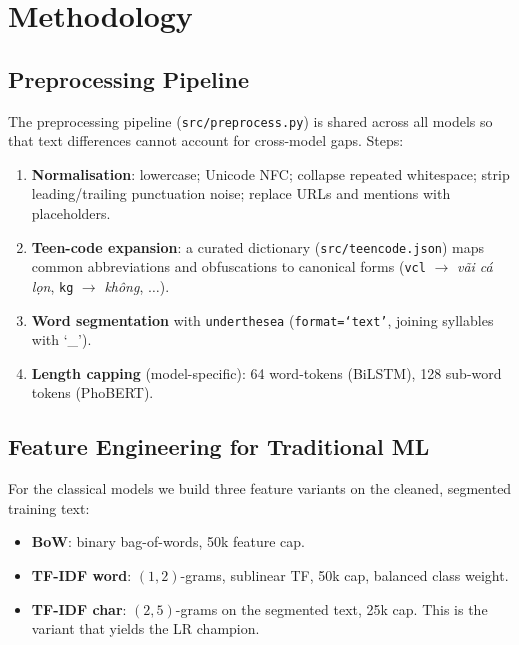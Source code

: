 \documentclass[a4paper,12pt,oneside]{report}
\begin{document}
\chapter{Methodology}
\label{ch:methodology}

\section{Preprocessing Pipeline}
The preprocessing pipeline (\texttt{src/preprocess.py}) is shared across
all models so that text differences cannot account for cross-model gaps.
Steps:

\begin{enumerate}
  \item \textbf{Normalisation}: lowercase; Unicode NFC; collapse repeated
        whitespace; strip leading/trailing punctuation noise; replace
        URLs and mentions with placeholders.
  \item \textbf{Teen-code expansion}: a curated dictionary
        (\texttt{src/teencode.json}) maps common abbreviations and
        obfuscations to canonical forms (\texttt{vcl}
        $\rightarrow$ \emph{v\~ai c\'a l\d{o}n},
        \texttt{kg} $\rightarrow$ \emph{kh\^ong}, $\ldots$).
  \item \textbf{Word segmentation} with \texttt{underthesea}
        (\texttt{format=`text'}, joining syllables with `\_').
  \item \textbf{Length capping} (model-specific): 64 word-tokens
        (BiLSTM), 128 sub-word tokens (PhoBERT).
\end{enumerate}

\section{Feature Engineering for Traditional ML}
For the classical models we build three feature variants on the cleaned,
segmented training text:

\begin{itemize}
  \item \textbf{BoW}: binary bag-of-words, 50k feature cap.
  \item \textbf{TF-IDF word}: $(1,2)$-grams, sublinear TF, 50k cap,
        balanced class weight.
  \item \textbf{TF-IDF char}: $(2,5)$-grams on the segmented text, 25k
        cap. This is the variant that yields the LR champion.
\end{itemize}
\end{document}

